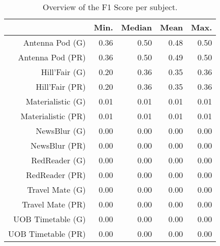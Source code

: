\begin{table}[ht]
\centering
\begin{tabular}{rrrrr}
  \hline
 & Min. & Median & Mean & Max. \\ 
  \hline
Antenna Pod (G) & 0.36 & 0.50 & 0.48 & 0.50 \\ 
  Antenna Pod (PR) & 0.36 & 0.50 & 0.49 & 0.50 \\ 
  Hill'Fair (G) & 0.20 & 0.36 & 0.35 & 0.36 \\ 
  Hill'Fair (PR) & 0.20 & 0.36 & 0.35 & 0.36 \\ 
  Materialistic (G) & 0.01 & 0.01 & 0.01 & 0.01 \\ 
  Materialistic (PR) & 0.01 & 0.01 & 0.01 & 0.01 \\ 
  NewsBlur (G) & 0.00 & 0.00 & 0.00 & 0.00 \\ 
  NewsBlur (PR) & 0.00 & 0.00 & 0.00 & 0.00 \\ 
  RedReader (G) & 0.00 & 0.00 & 0.00 & 0.00 \\ 
  RedReader (PR) & 0.00 & 0.00 & 0.00 & 0.00 \\ 
  Travel Mate (G) & 0.00 & 0.00 & 0.00 & 0.00 \\ 
  Travel Mate (PR) & 0.00 & 0.00 & 0.00 & 0.00 \\ 
  UOB Timetable (G) & 0.00 & 0.00 & 0.00 & 0.00 \\ 
  UOB Timetable (PR) & 0.00 & 0.00 & 0.00 & 0.00 \\ 
   \hline
\end{tabular}
\caption{Overview of the F1 Score per subject.} 
\label{tab:results:rq3:summary:subject:f1_score}
\end{table}
